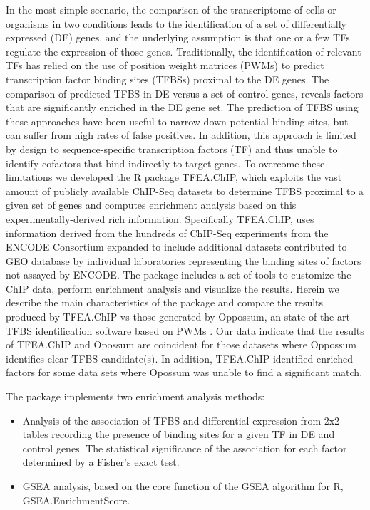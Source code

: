 \documentclass[a4paper, 12pt ]{article}
\begin{document}
 In the most simple scenario, the comparison of the transcriptome of cells or organisms in two conditions leads to the identification of a set of differentially expressed (DE) genes, and the underlying assumption is that one or a few TFs regulate the expression of those genes. Traditionally, the identification of relevant TFs has relied on the use of position weight matrices (PWMs) to predict transcription factor binding sites (TFBSs) proximal to the DE genes\cite{Wasserman}. The comparison of predicted TFBS in DE versus a set of control genes, reveals factors that are significantly enriched in the DE gene set. The prediction of TFBS using these approaches have been useful to narrow down potential binding sites, but can suffer from high rates of false positives. In addition, this approach is limited by design to sequence-specific transcription factors (TF) and thus unable to identify cofactors that bind indirectly to target genes. To overcome these limitations we developed the R package TFEA.ChIP, which exploits the vast amount of publicly available ChIP-Seq datasets to determine TFBS proximal to a given set of genes and computes enrichment analysis based on this experimentally-derived rich information. Specifically TFEA.ChIP, uses information derived from the hundreds of ChIP-Seq experiments from the ENCODE Consortium\cite{ENCODE} expanded to include additional datasets contributed to GEO database\cite{GEO1}\cite{GEO2} by individual laboratories representing the binding sites of factors not assayed by ENCODE. The package includes a set of tools to customize the ChIP data, perform enrichment analysis and visualize the results. Herein we describe the main characteristics of the package and compare the results produced by TFEA.ChIP vs those generated by Oppossum, an state of the art TFBS identification software based on PWMs \cite{Kwon2012}. Our data indicate that the results of TFEA.ChIP and Opossum are coincident for those datasets where Oppossum identifies clear TFBS candidate(s). In addition, TFEA.ChIP identified enriched factors for some data sets where Opossum was unable to find a significant match.
 
 The package implements two enrichment analysis methods:

\begin{itemize}
 \item Analysis of the association of TFBS and differential expression from 2x2 tables recording the presence of binding sites for a given TF in DE and control genes. The statistical significance of the association for each factor determined by a Fisher’s exact test.
 
 \item GSEA analysis, based on the core function of the GSEA algorithm for R\cite{GSEA1}\cite{GSEA2}, GSEA.EnrichmentScore.
\end{itemize}
\end{document}
